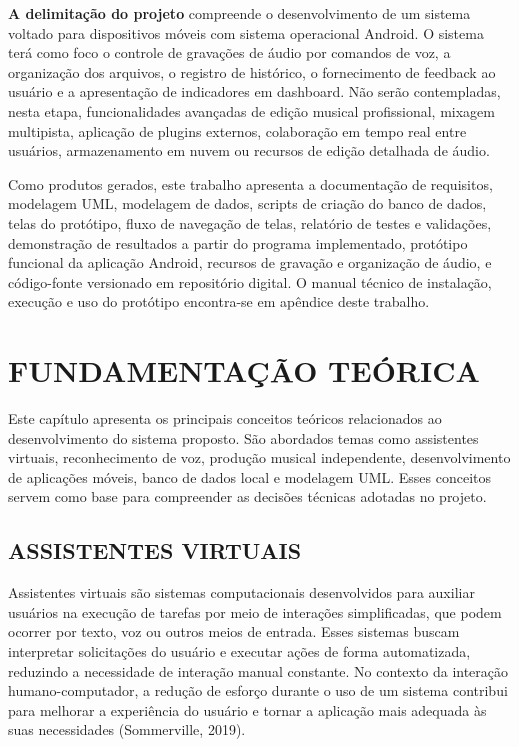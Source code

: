 \documentclass[12pt,oneside,a4paper,brazil,final]{abntex2}
\begin{document}
\textbf{A delimitação do projeto} compreende o desenvolvimento de um sistema voltado para dispositivos móveis com sistema operacional Android. O sistema terá como foco o controle de gravações de áudio por comandos de voz, a organização dos arquivos, o registro de histórico, o fornecimento de feedback ao usuário e a apresentação de indicadores em dashboard. Não serão contempladas, nesta etapa, funcionalidades avançadas de edição musical profissional, mixagem multipista, aplicação de plugins externos, colaboração em tempo real entre usuários, armazenamento em nuvem ou recursos de edição detalhada de áudio.



Como produtos gerados, este trabalho apresenta a documentação de requisitos, modelagem UML, modelagem de dados, scripts de criação do banco de dados, telas do protótipo, fluxo de navegação de telas, relatório de testes e validações, demonstração de resultados a partir do programa implementado, protótipo funcional da aplicação Android, recursos de gravação e organização de áudio, e código-fonte versionado em repositório digital. O manual técnico de instalação, execução e uso do protótipo encontra-se em apêndice deste trabalho.







\chapter{FUNDAMENTAÇÃO TEÓRICA}



Este capítulo apresenta os principais conceitos teóricos relacionados ao desenvolvimento do sistema proposto. São abordados temas como assistentes virtuais, reconhecimento de voz, produção musical independente, desenvolvimento de aplicações móveis, banco de dados local e modelagem UML. Esses conceitos servem como base para compreender as decisões técnicas adotadas no projeto.



\section{ASSISTENTES VIRTUAIS}



Assistentes virtuais são sistemas computacionais desenvolvidos para auxiliar usuários na execução de tarefas por meio de interações simplificadas, que podem ocorrer por texto, voz ou outros meios de entrada. Esses sistemas buscam interpretar solicitações do usuário e executar ações de forma automatizada, reduzindo a necessidade de interação manual constante. No contexto da interação humano-computador, a redução de esforço durante o uso de um sistema contribui para melhorar a experiência do usuário e tornar a aplicação mais adequada às suas necessidades (Sommerville, 2019).
\end{document}
